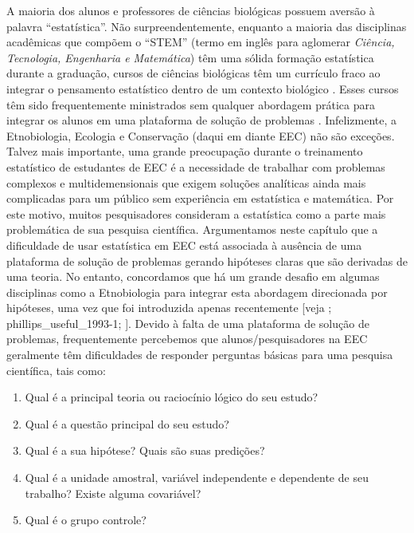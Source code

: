 \documentclass[
]{book}
\providecommand{\tightlist}{%
  \setlength{\itemsep}{0pt}\setlength{\parskip}{0pt}}
\begin{document}
A maioria dos alunos e professores de ciências biológicas possuem aversão à palavra ``estatística''. Não surpreendentemente, enquanto a maioria das disciplinas acadêmicas que compõem o ``STEM'' (termo em inglês para aglomerar \emph{Ciência, Tecnologia, Engenharia e Matemática}) têm uma sólida formação estatística durante a graduação, cursos de ciências biológicas têm um currículo fraco ao integrar o pensamento estatístico dentro de um contexto biológico \citep{metz_teaching_2008}. Esses cursos têm sido frequentemente ministrados sem qualquer abordagem prática para integrar os alunos em uma plataforma de solução de problemas \citep{horgan_teaching_1999}. Infelizmente, a Etnobiologia, Ecologia e Conservação (daqui em diante EEC) não são exceções. Talvez mais importante, uma grande preocupação durante o treinamento estatístico de estudantes de EEC é a necessidade de trabalhar com problemas complexos e multidemensionais que exigem soluções analíticas ainda mais complicadas para um público sem experiência em estatística e matemática. Por este motivo, muitos pesquisadores consideram a estatística como a parte mais problemática de sua pesquisa científica. Argumentamos neste capítulo que a dificuldade de usar estatística em EEC está associada à ausência de uma plataforma de solução de problemas gerando hipóteses claras que são derivadas de uma teoria. No entanto, concordamos que há um grande desafio em algumas disciplinas como a Etnobiologia para integrar esta abordagem direcionada por hipóteses, uma vez que foi introduzida apenas recentemente {[}veja \citet{phillips_useful_1993}; phillips\_useful\_1993-1; \citet{albuquerque_five_2009}{]}. Devido à falta de uma plataforma de solução de problemas, frequentemente percebemos que alunos/pesquisadores na EEC geralmente têm dificuldades de responder perguntas básicas para uma pesquisa científica, tais como:

\begin{enumerate}
\def\labelenumi{\arabic{enumi}.}
\tightlist
\item
  Qual é a principal teoria ou raciocínio lógico do seu estudo?
\item
  Qual é a questão principal do seu estudo?
\item
  Qual é a sua hipótese? Quais são suas predições?
\item
  Qual é a unidade amostral, variável independente e dependente de seu trabalho? Existe alguma covariável?
\item
  Qual é o grupo controle?
\end{enumerate}
\end{document}
